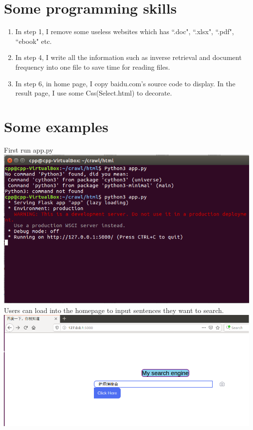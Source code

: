 \documentclass{article}
\begin{document}
\section{Some programming skills}
\begin{enumerate}
\item In step 1, I remove some useless websites which has ``.doc", ``.xlsx", ``.pdf", ``ebook" etc.
\item In step 4, I write all the information such as inverse retrieval and document frequency into one file to save time for reading files.
\item In step 6, in home page, I copy baidu.com's source code to display. In the result page, I use some Css(Select.html) to decorate.
\end{enumerate}
\section{Some examples}
First run app.py \\
\includegraphics[width=1\textwidth]{start} \\
Users can load into the homepage to input sentences they want to search. \\
\includegraphics[width=1\textwidth]{home} \\
\end{document}
